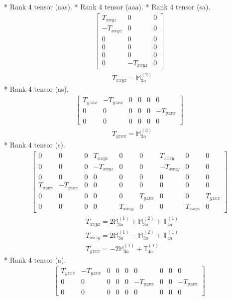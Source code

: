 \documentclass[fleqn,8pt,landscape]{jsarticle}
\begin{document}
* Rank 4 tensor (aas).
* Rank 4 tensor (aaa).
* Rank 4 tensor (sa).
\begin{align*}
\begin{bmatrix} T_{xxyz} & 0 & 0 \\ - T_{xxyz} & 0 & 0 \\ 0 & 0 & 0 \\ 0 & 0 & 0 \\ 0 & 0 & 0 \\ 0 & - T_{xxyz} & 0 \end{bmatrix}
\end{align*}
\begin{align*}
& T_{xxyz} = \mathbb{M}_{3a}^{(2)}
\end{align*}
* Rank 4 tensor (as).
\begin{align*}
\begin{bmatrix} T_{yzxx} & - T_{yzxx} & 0 & 0 & 0 & 0 \\ 0 & 0 & 0 & 0 & 0 & - T_{yzxx} \\ 0 & 0 & 0 & 0 & 0 & 0 \end{bmatrix}
\end{align*}
\begin{align*}
& T_{yzxx} = \mathbb{M}_{3a}^{(3)}
\end{align*}
* Rank 4 tensor (s).
\begin{align*}
\begin{bmatrix} 0 & 0 & 0 & T_{xxyz} & 0 & 0 & T_{xxzy} & 0 & 0 \\ 0 & 0 & 0 & - T_{xxyz} & 0 & 0 & - T_{xxzy} & 0 & 0 \\ 0 & 0 & 0 & 0 & 0 & 0 & 0 & 0 & 0 \\ T_{yzxx} & - T_{yzxx} & 0 & 0 & 0 & 0 & 0 & 0 & 0 \\ 0 & 0 & 0 & 0 & 0 & T_{yzxx} & 0 & 0 & T_{yzxx} \\ 0 & 0 & 0 & 0 & T_{xxzy} & 0 & 0 & T_{xxyz} & 0 \end{bmatrix}
\end{align*}
\begin{align*}
& T_{xxyz} = 2 \mathbb{M}_{3a}^{(1)} + \mathbb{M}_{3a}^{(2)} + \mathbb{T}_{4a}^{(1)} \\
& T_{xxzy} = 2 \mathbb{M}_{3a}^{(1)} - \mathbb{M}_{3a}^{(2)} + \mathbb{T}_{4a}^{(1)} \\
& T_{yzxx} = - 2 \mathbb{M}_{3a}^{(1)} + \mathbb{T}_{4a}^{(1)}
\end{align*}
* Rank 4 tensor (a).
\begin{align*}
\begin{bmatrix} T_{yzxx} & - T_{yzxx} & 0 & 0 & 0 & 0 & 0 & 0 & 0 \\ 0 & 0 & 0 & 0 & 0 & - T_{yzxx} & 0 & 0 & - T_{yzxx} \\ 0 & 0 & 0 & 0 & 0 & 0 & 0 & 0 & 0 \end{bmatrix}
\end{align*}
\end{document}
